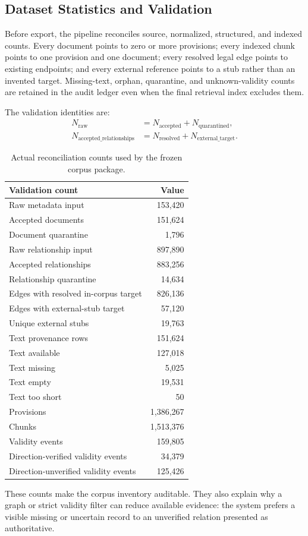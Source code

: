 \subsection{Dataset Statistics and Validation}
\label{sec:dataset-validation}

Before export, the pipeline reconciles source, normalized, structured, and
indexed counts. Every document points to zero or more provisions; every
indexed chunk points to one provision and one document; every resolved legal
edge points to existing endpoints; and every external reference points to a
stub rather than an invented target. Missing-text, orphan, quarantine, and
unknown-validity counts are retained in the audit ledger even when the final
retrieval index excludes them.

The validation identities are:
\begin{equation}
\begin{aligned}
N_{\mathrm{raw}} &= N_{\mathrm{accepted}} + N_{\mathrm{quarantined}},\\
N_{\mathrm{accepted\_relationships}} &= N_{\mathrm{resolved}} + N_{\mathrm{external\_target}}.
\end{aligned}
\end{equation}

\begin{table}[t]
\centering
\scriptsize
\caption{Actual reconciliation counts used by the frozen corpus package.}
\label{tab:actual-reconciliation}
\begin{tabular}{lr}
\toprule
\textbf{Validation count} & \textbf{Value} \\
\midrule
Raw metadata input & 153,420 \\
Accepted documents & 151,624 \\
Document quarantine & 1,796 \\
\midrule
Raw relationship input & 897,890 \\
Accepted relationships & 883,256 \\
Relationship quarantine & 14,634 \\
Edges with resolved in-corpus target & 826,136 \\
Edges with external-stub target & 57,120 \\
Unique external stubs & 19,763 \\
\midrule
Text provenance rows & 151,624 \\
Text available & 127,018 \\
Text missing & 5,025 \\
Text empty & 19,531 \\
Text too short & 50 \\
Provisions & 1,386,267 \\
Chunks & 1,513,376 \\
Validity events & 159,805 \\
Direction-verified validity events & 34,379 \\
Direction-unverified validity events & 125,426 \\
\bottomrule
\end{tabular}
\end{table}

These counts make the corpus inventory auditable. They also explain why a graph or strict validity filter can reduce available evidence: the system prefers a visible missing or uncertain record to an unverified relation presented as authoritative.
